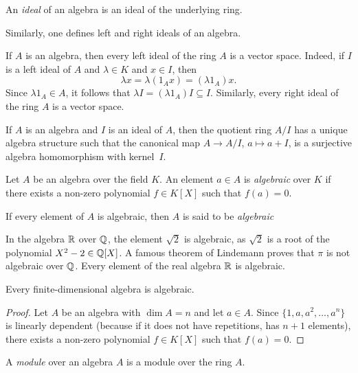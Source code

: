 \begin{definition}
 	An \emph{ideal} of an algebra is an ideal of the underlying ring.
\end{definition}

Similarly, one defines left and right ideals of an algebra.

If $A$ is an algebra, then every left ideal of the ring $A$ is a vector space.  
Indeed, if $I$ is a left ideal of $A$ 
and $\lambda\in K$ and $x\in I$, then 
\[
	\lambda x=\lambda (1_Ax)=(\lambda 1_A)x.
\]
Since $\lambda 1_A\in A$, it follows that  $\lambda I=(\lambda
1_A)I\subseteq I$. 
Similarly, every right ideal of the ring $A$ is a vector space. 

If $A$ is an algebra and $I$ is an ideal of $A$, then the quotient ring $A/I$ has a unique algebra
structure such that the canonical map  
$A\to A/I$, $a\mapsto a+I$, is a surjective algebra homomorphism with kernel~$I$. 

\begin{definition}
    Let $A$ be an algebra over the field $K$. An element $a\in A$ is 
    \emph{algebraic} over $K$ if there exists a non-zero polynomial $f\in K[X]$
    such that $f(a)=0$. 
\end{definition}

If every element of $A$ is algebraic, then $A$ is said to be \emph{algebraic} 

In the algebra $\mathbb{R}$ over $\mathbb{Q}$, the element $\sqrt{2}$ is algebraic, as $\sqrt{2}$ is a root of the polynomial $X^2-2\in\mathbb{Q}[X]$. A famous theorem of Lindemann proves that $\pi$ is not algebraic over $\mathbb{Q}$. Every element of the real algebra $\mathbb{R}$ is algebraic.

\begin{proposition}
	\label{lem:algebraic}
	Every finite-dimensional algebra is algebraic.
\end{proposition}

\begin{proof}
   Let $A$ be an algebra with $\dim A=n$ and let $a\in A$. Since  
	$\{1,a,a^2,\dots,a^n\}$ is linearly dependent (because if it does not have repetitions, has $n+1$ elements), there exists 
	a non-zero polynomial $f\in K[X]$ such that $f(a)=0$.
\end{proof}

\begin{definition}
    A \emph{module} over an algebra $A$ is a module 
    over the ring $A$.
\end{definition}

